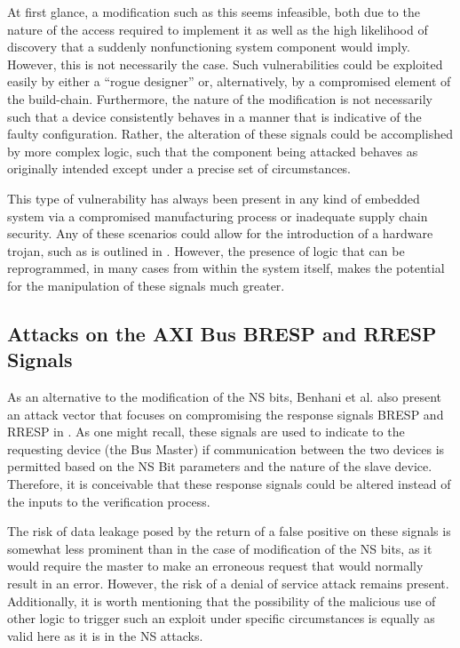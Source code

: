 \documentclass[journal]{IEEEtran}
\begin{document}
At first glance, a modification such as this seems infeasible, both due to the nature of
the access required to implement it as well as the high likelihood of discovery that a
suddenly nonfunctioning system component would imply. However, this is not necessarily the
case. Such vulnerabilities could be exploited easily by either a ``rogue designer'' or,
alternatively, by a compromised element of the build-chain. Furthermore, the nature of the
modification is not necessarily such that a device consistently behaves in a manner that 
is indicative of the faulty configuration. Rather, the alteration of these signals could 
be accomplished by more complex logic, such that the component being attacked behaves as
originally intended except under a precise set of circumstances.

This type of vulnerability has always been present in any kind of embedded system via a
compromised manufacturing process or inadequate supply chain security. Any of these
scenarios could allow for the introduction of a hardware trojan, such as is outlined in
\cite{bhunia_hardware_2014}. However, the presence of logic that can be reprogrammed, in
many cases from within the system itself, makes the potential for the manipulation of
these signals much greater.


\subsection{Attacks on the AXI Bus BRESP and RRESP Signals} \label{sec:RESP Attacks}
As an alternative to the modification of the NS bits, Benhani et al. also present an
attack vector that focuses on compromising the response signals BRESP and RRESP in 
\cite{benhani_security_2019}. As one might recall, these signals are used to indicate to
the requesting device (the Bus Master) if communication between the two devices is
permitted based on the NS Bit parameters and the nature of the slave device. Therefore, it
is conceivable that these response signals could be altered instead of the inputs to the
verification process. 

The risk of data leakage posed by the return of a false positive on these signals is
somewhat less prominent than in the case of modification of the NS bits, as it would
require the master to make an erroneous request that would normally result in an error. 
However, the risk of a denial of service attack remains present. Additionally, it is worth
mentioning that the possibility of the malicious use of other logic to trigger such an
exploit under specific circumstances is equally as valid here as it is in the NS attacks.
\end{document}
